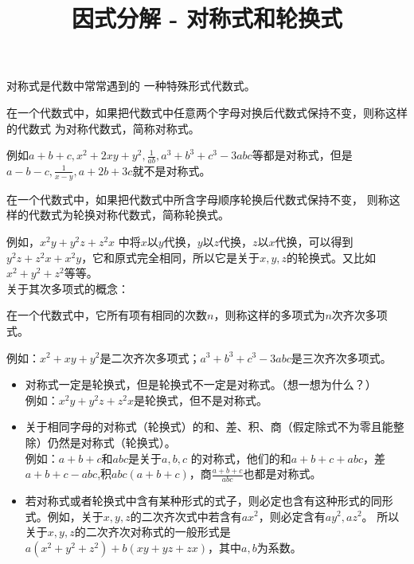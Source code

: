 \documentclass[windows,csize4]{BHCexam}
\title{因式分解 - 对称式和轮换式}
\begin{document}
\maketitle

\begin{groups}
    对称式是代数中常常遇到的 一种特殊形式代数式。\\
    \fbox
    {
        \parbox{\textwidth}
        {
            在一个代数式中，如果把代数式中任意两个字母对换后代数式保持不变，则称这样的代数式
            为对称代数式，简称对称式。
        }
    }
    例如$a+b+c,x^2+2xy+y^2,\frac{1}{ab},a^3+b^3+c^3-3abc$等都是对称式，但是
    $a-b-c,\frac{1}{x-y},a+2b+3c$就不是对称式。 \\

    \fbox
    {
        \parbox{\textwidth}
        {
            在一个代数式中，如果把代数式中所含字母顺序轮换后代数式保持不变，
            则称这样的代数式为轮换对称代数式，简称轮换式。
        }
    }
    例如，$x^2y+y^2z+z^2x$ 中将$x$以$y$代换，$y$以$z$代换，$z$以$x$代换，可以得到
    $y^2z+z^2x+x^2y$，它和原式完全相同，所以它是关于$x,y,z$的轮换式。又比如$x^2+y^2+z^2$等等。 \\

    关于其次多项式的概念： \\
    \fbox
    {
        \parbox{\textwidth}
        {
            在一个代数式中，它所有项有相同的次数$n$，则称这样的多项式为$n$次齐次多项式。
        }
    }
    例如：$x^2+xy+y^2$是二次齐次多项式；$a^3+b^3+c^3-3abc$是三次齐次多项式。


    \begin{itemize}
        \item 对称式一定是轮换式，但是轮换式不一定是对称式。（想一想为什么？）\\
              例如：$x^2y+y^2z+z^2x$是轮换式，但不是对称式。
        \item 关于相同字母的对称式（轮换式）的和、差、积、商（假定除式不为零且能整除）仍然是对称式（轮换式）。\\
              例如：$a+b+c$和$abc$是关于$a,b,c$ 的对称式，他们的和$a+b+c+abc$，差$a+b+c-abc$,积$abc(a+b+c)$，商$\frac{a+b+c}{abc}$也都是对称式。
        \item 若对称式或者轮换式中含有某种形式的式子，则必定也含有这种形式的同形式。例如，关于$x,y,z$的二次齐次式中若含有$ax^2$，则必定含有$ay^2,az^2$。
              所以关于$x,y,z$的二次齐次对称式的一般形式是$a(x^2+y^2+z^2)+b(xy+yz+zx)$，其中$a,b$为系数。
    \end{itemize}


\end{groups}
\end{document}
